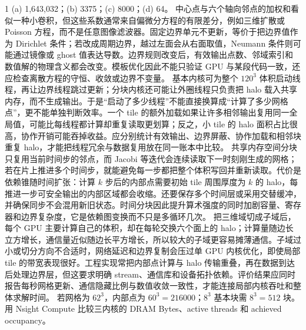 \begin{solutionexercise}{1}
\conclusionheading (a) 1,643,032；(b) 3375；(c) 8000；(d) 64。
\discussionheading
{}
中心点与六个轴向邻点的加权和看似一种小卷积，但这些系数通常来自偏微分方程的有限差分，例如三维扩散或 Poisson 方程，而不是任意图像滤波器。固定边界单元不更新，等价于把边界值作为 Dirichlet 条件；若改成周期边界，越过左面会从右面取值，Neumann 条件则可能通过镜像或 ghost 值表达导数。边界规则改变后，有效输出点数、邻域索引和数值解的物理含义都会改变。模板优化因此不能只验证 GPU 与某段代码一致，还应检查离散方程的守恒、收敛或边界不变量。
基本内核可为整个 $120^3$ 体积启动线程，再让边界线程跳过更新；分块内核还可能让外圈线程只负责把 halo 载入共享内存，而不生成输出。于是“启动了多少线程”不能直接换算成“计算了多少网格点”，更不能单独判断效率。一个 tile 的额外加载如果让许多相邻输出复用同一全局值，可能比每线程都计算却重复读取更划算；反之，小 tile 的 halo 面积占比很高，协作开销可能吞掉收益。应分别统计有效输出、边界屏蔽、协作加载和相邻块重复 halo，才能把线程冗余与数据复用放在同一账本中比较。
共享内存空间分块只复用当前时间步的邻点，而 Jacobi 等迭代会连续读取下一时刻刚生成的网格；若在片上推进多个时间步，就能避免每一步都把整个体积写回并重新读取。代价是依赖锥随时间扩张：计算 $k$ 步后的内部点需要初始 tile 周围厚度为 $k$ 的 halo，每推进一步可安全输出的内部区域都会收缩。还要保存多个时间层或采用交替缓冲，并确保同步不会混用新旧状态。时间分块因此提升算术强度的同时加剧容量、寄存器和边界复杂度，它是依赖图变换而不只是多循环几次。
把三维域切成子域后，每个 GPU 主要计算自己的体积，却在每轮交换六个面上的 halo；计算量随边长立方增长，通信量近似随边长平方增长，所以较大的子域更容易摊薄通信。子域过小或切分方向不合适时，网络延迟和边界复制会压过单 GPU 内核优化，即使局部 tile 的带宽表现很好。工程实现常把内部点计算与 halo 传输重叠，再在数据到达后处理边界层，但这要求明确 stream、通信库和设备拓扑依赖。评价结果应同时报告每秒网格更新、通信隐藏比例与数值收敛一致性，才能连接局部内核吞吐和整体求解时间。
\variantheading 若网格为 $62^3$，内部点为 $60^3=216000$；$8^3$ 基本块需 $8^3=512$ 块。
\practiceheading 用 Nsight Compute 比较三内核的 DRAM Bytes、active threads 和 achieved occupancy。
\end{solutionexercise}

